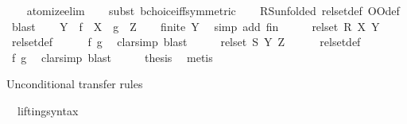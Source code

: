 \begin{isabellebody}
\ \ \isamarkupfalse%
\ atomize{\isacharunderscore}elim\isanewline
\ \ \isamarkupfalse%
\ {\isacharparenleft}subst\ bchoice{\isacharunderscore}iff{\isacharbrackleft}symmetric{\isacharbrackright}{\isacharparenright}\isanewline
\ \ \isamarkupfalse%
\ R{\isacharunderscore}S{\isacharbrackleft}unfolded\ rel{\isacharunderscore}set{\isacharunderscore}def\ OO{\isacharunderscore}def{\isacharbrackright}\ \isamarkupfalse%
\ blast\isanewline
\isanewline
\ \ \isamarkupfalse%
\ {\isacharquery}Y\ {\isacharequal}\ {\isachardoublequoteopen}f\ {\isacharbackquote}\ X\ {\isasymunion}\ g\ {\isacharbackquote}\ Z{\isachardoublequoteclose}\isanewline
\ \ \isamarkupfalse%
\ {\isachardoublequoteopen}finite\ {\isacharquery}Y{\isachardoublequoteclose}\ \isamarkupfalse%
\ {\isacharparenleft}simp\ add{\isacharcolon}\ fin{\isacharparenright}\isanewline
\ \ \isamarkupfalse%
\ \isamarkupfalse%
\ {\isachardoublequoteopen}rel{\isacharunderscore}set\ R\ X\ {\isacharquery}Y{\isachardoublequoteclose}\isanewline
\ \ \ \ \isamarkupfalse%
\ rel{\isacharunderscore}set{\isacharunderscore}def\isanewline
\ \ \ \ \isamarkupfalse%
\ f\ g\ \isamarkupfalse%
\ clarsimp\ blast\isanewline
\ \ \isamarkupfalse%
\ \isamarkupfalse%
\ {\isachardoublequoteopen}rel{\isacharunderscore}set\ S\ {\isacharquery}Y\ Z{\isachardoublequoteclose}\isanewline
\ \ \ \ \isamarkupfalse%
\ rel{\isacharunderscore}set{\isacharunderscore}def\isanewline
\ \ \ \ \isamarkupfalse%
\ f\ g\ \isamarkupfalse%
\ clarsimp\ blast\isanewline
\ \ \isamarkupfalse%
\ \isamarkupfalse%
\ {\isacharquery}thesis\ \isamarkupfalse%
\ metis\isanewline
{}\isamarkupfalse%
%
\endisatagproof
{\isafoldproof}%
%
\isadelimproof
%
\endisadelimproof
%
\isadelimdocument
%
\endisadelimdocument
%
\isatagdocument
%
\isamarkuptrue%
%
\endisatagdocument
{\isafolddocument}%
%
\isadelimdocument
%
\endisadelimdocument
%
\begin{isamarkuptext}%
Unconditional transfer rules%
\end{isamarkuptext}\isamarkuptrue%
\isamarkupfalse%
\ \ lifting{\isacharunderscore}syntax\isanewline
{}\isanewline
\isanewline
{}\isamarkupfalse%

\end{isabellebody}
